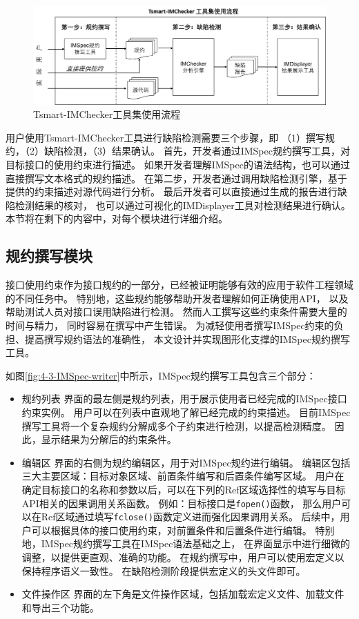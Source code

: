\begin{figure}[t]
	\centering
	\includegraphics[width=\linewidth]{figures/cp4-overview.png}
	\caption{
		Tsmart-IMChecker工具集使用流程
	}
	\label{fig:4-3-overview}
\end{figure}

用户使用Tsmart-IMChecker工具进行缺陷检测需要三个步骤，即
（1）撰写规约，（2）缺陷检测，（3）结果确认。
首先，开发者通过IMSpec规约撰写工具，对目标接口的使用约束进行描述。
如果开发者理解IMSpec的语法结构，也可以通过直接撰写文本格式的规约描述。
在第二步，开发者通过调用缺陷检测引擎，基于提供的约束描述对源代码进行分析。
最后开发者可以直接通过生成的报告进行缺陷检测结果的核对，
也可以通过可视化的IMDisplayer工具对检测结果进行确认。
本节将在剩下的内容中，对每个模块进行详细介绍。


\subsection{规约撰写模块}
接口使用约束作为接口规约的一部分，已经被证明能够有效的应用于软件工程领域的不同任务中。
特别地，这些规约能够帮助开发者理解如何正确使用API，
以及帮助测试人员对接口误用缺陷进行检测。
然而人工撰写这些约束条件需要大量的时间与精力，
同时容易在撰写中产生错误。
为减轻使用者撰写IMSpec约束的负担、提高撰写规约语法的准确性，
本文设计并实现图形化支撑的IMSpec规约撰写工具。

如图\ref{fig:4-3-IMSpec-writer}中所示，IMSpec规约撰写工具包含三个部分：
\begin{itemize}
	\item {\kaishu 规约列表}
	界面的最左侧是规约列表，用于展示使用者已经完成的IMSpec接口约束实例。
	用户可以在列表中直观地了解已经完成的约束描述。
	目前IMSpec撰写工具将一个复杂规约分解成多个子约束进行检测，以提高检测精度。
	因此，显示结果为分解后的约束条件。
	\item {\kaishu 编辑区} 
	界面的右侧为规约编辑区，用于对IMSpec规约进行编辑。
	编辑区包括三大主要区域：目标对象区域、前置条件编写和后置条件编写区域。
	用户在确定目标接口的名称和参数以后，可以在下列的Ref区域选择性的填写与目标API相关的因果调用关系函数。
	例如：目标接口是\texttt{fopen()}函数，
	那么用户可以在Ref区域通过填写\texttt{fclose()}函数定义进而强化因果调用关系。
	后续中，用户可以根据具体的接口使用约束，对前置条件和后置条件进行编辑。
	特别地，IMSpec规约撰写工具在IMSpec语法基础之上，
	在界面显示中进行细微的调整，以提供更直观、准确的功能。
	在规约撰写中，用户可以使用宏定义以保持程序语义一致性。
	在缺陷检测阶段提供宏定义的头文件即可。
	\item {\kaishu 文件操作区} 
	界面的左下角是文件操作区域，包括加载宏定义文件、加载文件和导出三个功能。
	
\end{itemize}


